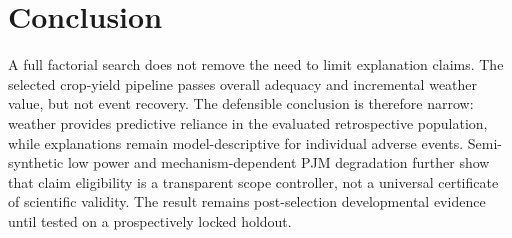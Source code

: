 \documentclass[conference]{IEEEtran}
\begin{document}
\section{Conclusion}
A full factorial search does not remove the need to limit explanation claims.
The selected crop-yield pipeline passes overall adequacy and incremental weather
value, but not event recovery. The defensible conclusion is therefore narrow:
weather provides predictive reliance in the evaluated retrospective population,
while explanations remain model-descriptive for individual adverse events.
Semi-synthetic low power and mechanism-dependent PJM degradation further show
that claim eligibility is a transparent scope controller, not a universal
certificate of scientific validity. The result remains post-selection
developmental evidence until tested on a prospectively locked holdout.

\FloatBarrier


\end{document}
